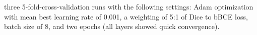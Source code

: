three 5-fold-cross-validation runs with the following settings:
Adam optimization with mean best learning rate of 0.001,
a weighting of 5:1 of Dice to bBCE loss,
batch size of 8, and
two epochs (all layers showed quick convergence).

